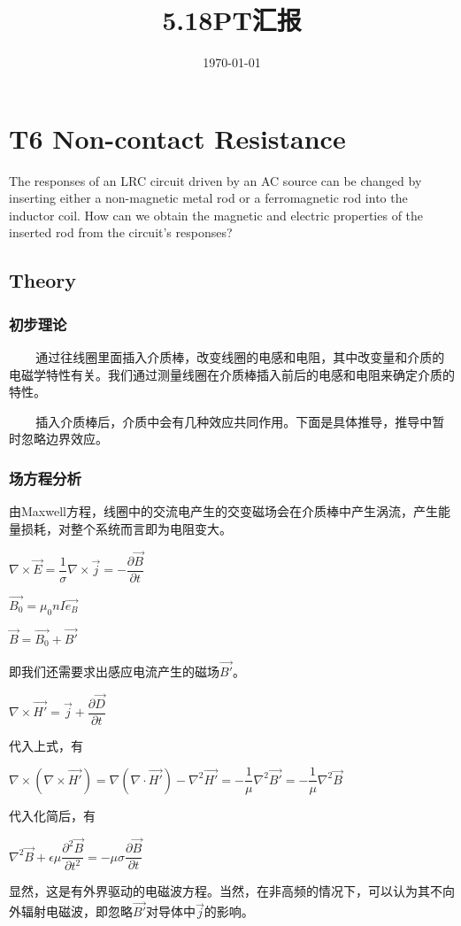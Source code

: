 \documentclass[11pt]{beamer}                                                                                               \usetheme{Boadilla}
\begin{document}
	\title[PT Summary]{5.18PT汇报}
	\author[Tang Yi]{} %
	\institute[]{} %
	\date{\today}  %
	\begin{frame}
		\titlepage
	\end{frame}
	\section{T6 Non-contact Resistance}
	
	\begin{frame}
		\sectionpage
		The responses of an LRC circuit driven by an AC source can be changed by inserting either a non-magnetic metal rod or a ferromagnetic rod into the inductor coil. How can we obtain the magnetic and electric properties of the inserted rod from the circuit's responses?
	\end{frame}
	\subsection{Theory}
	\begin{frame}[fragile]
		\frametitle{初步理论}
		\,\,\,\,\,\,\,\,\,\,\,\,\,通过往线圈里面插入介质棒，改变线圈的电感和电阻，其中改变量和介质的电磁学特性有关。我们通过测量线圈在介质棒插入前后的电感和电阻来确定介质的特性。
		
		\,\,\,\,\,\,\,\,\,\,\,\,\,插入介质棒后，介质中会有几种效应共同作用。下面是具体推导，推导中暂时忽略边界效应。
		
	\end{frame}
	
	\begin{frame}[fragile]
		\frametitle{场方程分析}
		由Maxwell方程，线圈中的交流电产生的交变磁场会在介质棒中产生涡流，产生能量损耗，对整个系统而言即为电阻变大。
		
		\centerline{$\nabla \times \vec{E}=\dfrac{1}{\sigma}\nabla \times \vec{j}=-\dfrac{\partial \vec{B}}{\partial t}$}
		
		\centerline{$\vec{B_0}=\mu_0 n I \vec{e_B}$}
		
		\centerline{$\vec{B}=\vec{B_0}+\vec{B'}$}
		
		即我们还需要求出感应电流产生的磁场$\vec{B'}$。
		\centerline{$\nabla \times \vec{H'}=\vec{j}+\dfrac{\partial \vec{D}}{\partial t}$}
		
		代入上式，有
		\centerline{$\nabla \times (\nabla \times \vec{H'})=\nabla(\nabla \cdot \vec{H'})-\nabla^2 \vec{H'}=-\dfrac{1}{\mu} \nabla^2 \vec{B'}=-\dfrac{1}{\mu} \nabla^2 \vec{B}$}
		
		代入化简后，有
		\centerline{$\nabla^2 \vec{B}+\epsilon \mu \dfrac{\partial^2 \vec{B}}{\partial t^2}=-\mu \sigma \dfrac{\partial \vec{B}}{\partial t}$}
		
		显然，这是有外界驱动的电磁波方程。当然，在非高频的情况下，可以认为其不向外辐射电磁波，即忽略$\vec{B'}$对导体中$\vec{j}$的影响。
		
	\end{frame}
	
\end{document}
